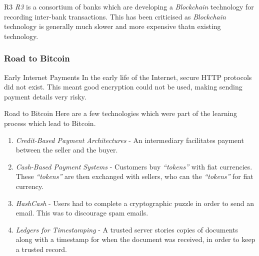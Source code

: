 \documentclass[11pt,a4paper]{article}
\begin{document}
  \begin{remark}{R3}
    \textit{R3} is a consortium of banks which are developing a \textit{Blockchain} technology for recording inter-bank transactions. This has been criticised as \textit{Blockchain} technology is generally much slower and more expensive thatn existing technology.
  \end{remark}

\subsubsection{Road to Bitcoin} \label{sec_RoadToBitcoin}

  \begin{remark}{Early Internet Payments}
    In the early life of the Internet, secure HTTP protocols did not exist. This meant good encryption could not be used, making sending payment details very risky.
  \end{remark}

  \begin{remark}{Road to Bitcoin}
    Here are a few technologies which were part of the learning process which lead to Bitcoin.
    \begin{enumerate}
      \item \textit{Credit-Based Payment Architectures} - An intermediary facilitates payment between the seller and the buyer.
      \item \textit{Cash-Based Payment Systems} - Customers buy \textit{``tokens''} with fiat currencies. These \textit{``tokens''} are then exchanged with sellers, who can the \textit{``tokens''} for fiat currency.
      \item \textit{HashCash} - Users had to complete a cryptographic puzzle in order to send an email. This was to discourage spam emails.
      \item \textit{Ledgers for Timestamping} - A trusted server stories copies of documents along with a timestamp for when the document was received, in order to keep a trusted record.
    \end{enumerate}
  \end{remark}
\end{document}
